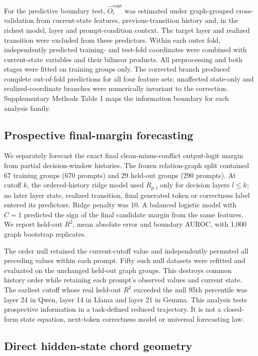\documentclass[12pt]{article}
\begin{document}
For the predictive boundary test, \(\hat O_l^{\mathrm{cont}}\) was estimated under graph-grouped cross-validation from current-state features, previous-transition history and, in the richest model, layer and prompt-condition context. The target layer and realized transition were excluded from these predictors. Within each outer fold, independently predicted training- and test-fold coordinates were combined with current-state variables and their bilinear products. All preprocessing and both stages were fitted on training groups only. The corrected branch produced complete out-of-fold predictions for all four feature sets; unaffected state-only and realized-coordinate branches were numerically invariant to the correction. Supplementary Methods Table 1 maps the information boundary for each analysis family.

\subsection*{Prospective final-margin forecasting}

We separately forecast the exact final clean-minus-conflict output-logit margin from partial decision-window histories. The frozen relation-graph split contained 67 training groups (670 prompts) and 29 held-out groups (290 prompts). At cutoff \(k\), the ordered-history ridge model used \(R_{p,l}\) only for decision layers \(l\leq k\); no later layer state, realized transition, final generated token or correctness label entered its predictors. Ridge penalty was 10. A balanced logistic model with \(C=1\) predicted the sign of the final candidate margin from the same features. We report held-out \(R^2\), mean absolute error and boundary AUROC, with 1,000 graph bootstrap replicates.

The order null retained the current-cutoff value and independently permuted all preceding values within each prompt. Fifty such null datasets were refitted and evaluated on the unchanged held-out graph groups. This destroys common history order while retaining each prompt's observed values and current state. The earliest cutoff whose real held-out \(R^2\) exceeded the null 95th percentile was layer 24 in Qwen, layer 14 in Llama and layer 21 in Gemma. This analysis tests prospective information in a task-defined reduced trajectory. It is not a closed-form state equation, next-token correctness model or universal forecasting law.

\subsection*{Direct hidden-state chord geometry}
\end{document}
